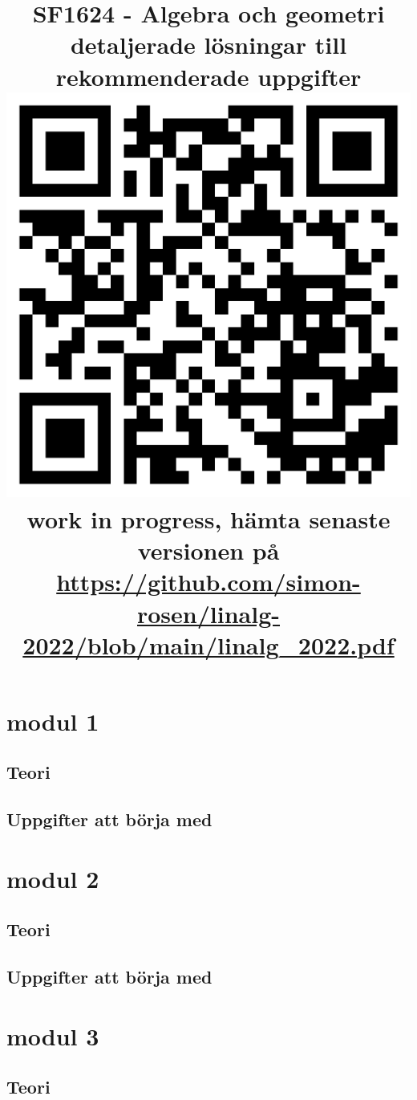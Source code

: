 \documentclass{article}
\title{SF1624 - Algebra och geometri\\ {\large detaljerade lösningar till rekommenderade uppgifter}\\
\bigskip\includegraphics[scale=0.25]{qrcode.png}\\
{\small work in progress, hämta senaste versionen på}
\\ {\small \url{https://github.com/simon-rosen/linalg-2022/blob/main/linalg_2022.pdf}}}
\begin{document}
\maketitle

\newpage 

\tableofcontents

\newpage

\section{modul 1}


\subsection{Teori}


\subsection{Uppgifter att börja med}


\section{modul 2}
\subsection{Teori}


\subsection{Uppgifter att börja med}


\section{modul 3}
\subsection{Teori}

\end{document}
